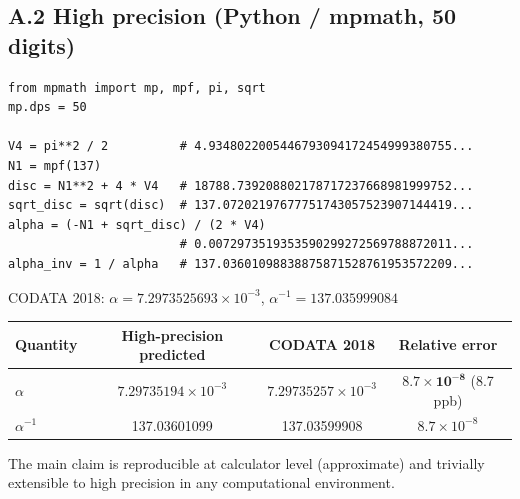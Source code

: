 \documentclass[a4paper,11pt]{article}
\begin{document}
\subsection*{A.2 High precision (Python / mpmath, 50 digits)}

\begin{verbatim}
from mpmath import mp, mpf, pi, sqrt
mp.dps = 50

V4 = pi**2 / 2          # 4.9348022005446793094172454999380755...
N1 = mpf(137)
disc = N1**2 + 4 * V4   # 18788.739208802178717237668981999752...
sqrt_disc = sqrt(disc)  # 137.07202197677751743057523907144419...
alpha = (-N1 + sqrt_disc) / (2 * V4)
                        # 0.0072973519353590299272569788872011...
alpha_inv = 1 / alpha   # 137.03601098838875871528761953572209...
\end{verbatim}

CODATA 2018: $\alpha = 7.2973525693 \times 10^{-3}$, $\alpha^{-1} = 137.035999084$

\begin{center}
\begin{tabular}{lccc}
\toprule
Quantity & High-precision predicted & CODATA 2018 & Relative error \\
\midrule
$\alpha$ & $7.29735194 \times 10^{-3}$ & $7.29735257 \times 10^{-3}$ & $\mathbf{8.7 \times 10^{-8}}$ (8.7 ppb) \\
$\alpha^{-1}$ & 137.03601099 & 137.03599908 & $8.7 \times 10^{-8}$ \\
\bottomrule
\end{tabular}
\end{center}

The main claim is reproducible at calculator level (approximate) and trivially extensible to high precision in any computational environment.
\end{document}

